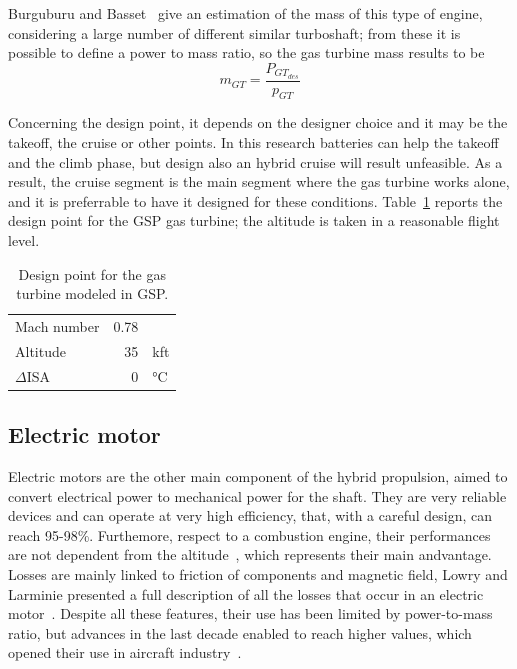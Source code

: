 Burguburu and Basset~\cite{bib:burguburu} give an estimation of the mass of this type of engine, considering a large number of different similar turboshaft; from these it is possible to define a power to mass ratio, so the gas turbine mass results to be
\begin{equation}
	\label{eq:tshaft_mass}
	m_{GT} = \frac{P_{GT_{des}}}{p_{GT}}
\end{equation}
 
Concerning the design point, it depends on the designer choice and it may be the takeoff, the cruise or other points. 
In this research batteries can help the takeoff and the climb phase, but design also an hybrid cruise will result unfeasible. 
As a result, the cruise segment is the main segment where the gas turbine works alone, and it is preferrable to have it designed for these conditions.
Table~\ref{tab:tshaft_design_point} reports the design point for the GSP gas turbine; the altitude is taken in a reasonable flight level.
\begin{table}[!h]
	\centering
	\begin{tabular}{l r l}
		\hline
		Mach number & 0.78 & \\
		Altitude & 35 & kft \\
		$\Delta$ISA & 0 & \si{\celsius} \\
		\hline
	\end{tabular}
	\caption{Design point for the gas turbine modeled in GSP.}
	\label{tab:tshaft_design_point}
\end{table} 

\subsection{Electric motor}

Electric motors are the other main component of the hybrid propulsion, aimed to convert electrical power to mechanical power for the shaft. 
They are very reliable devices and can operate at very high efficiency, that, with a careful design, can reach 95-98\%.
Furthemore, respect to a combustion engine, their performances are not dependent from the altitude~\cite{bib:seitz}, which represents their main andvantage. 
Losses are mainly linked to friction of components and magnetic field, Lowry and Larminie presented a full description of all the losses that occur in an electric motor~\cite{bib:lowry}.
Despite all these features, their use has been limited by power-to-mass ratio, but advances in the last decade enabled to reach higher values, which opened their use in aircraft industry~\cite{bib:campbell}. 

